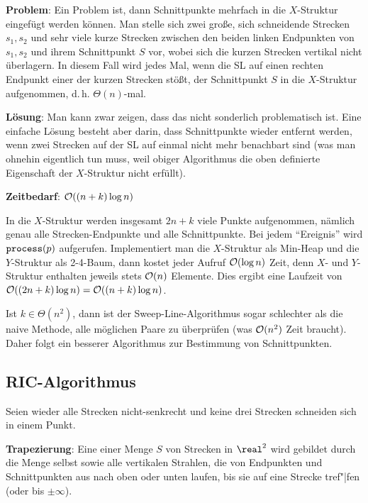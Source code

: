 \linie

\textbf{Problem}:
Ein Problem ist, dann Schnittpunkte mehrfach in die $X$-Struktur eingefügt werden können.
Man stelle sich zwei große, sich schneidende Strecken $s_1, s_2$
und sehr viele kurze Strecken zwischen den beiden linken Endpunkten von $s_1, s_2$ und
ihrem Schnittpunkt $S$ vor, wobei sich die kurzen Strecken vertikal nicht überlagern.
In diesem Fall wird jedes Mal, wenn die SL auf einen rechten Endpunkt einer der kurzen Strecken
stößt, der Schnittpunkt $S$ in die $X$-Struktur aufgenommen, d.\,h. $\Theta(n)$-mal.

\textbf{Lösung}:
Man kann zwar zeigen, dass das nicht sonderlich problematisch ist.
Eine einfache Lösung besteht aber darin, dass Schnittpunkte wieder entfernt werden,
wenn zwei Strecken auf der SL auf einmal nicht mehr benachbart sind
(was man ohnehin eigentlich tun muss, weil obiger Algorithmus die
oben definierte Eigenschaft der $X$-Struktur nicht erfüllt).

\linie

\textbf{Zeitbedarf}:
$\mathcal{O}((n + k) \log n)$

\begin{Beweis}
    In die $X$-Struktur werden insgesamt $2n + k$ viele Punkte aufgenommen, nämlich genau alle
    Strecken-Endpunkte und alle Schnittpunkte.
    Bei jedem "`Ereignis"' wird $\texttt{process}(p)$ aufgerufen.
    Implementiert man die $X$-Struktur als Min-Heap und die $Y$-Struktur als 2-4-Baum,
    dann kostet jeder Aufruf $\mathcal{O}(\log n)$ Zeit,
    denn $X$- und $Y$-Struktur enthalten jeweils stets $\mathcal{O}(n)$ Elemente.
    Dies ergibt eine Laufzeit von $\mathcal{O}((2n + k) \log n) = \mathcal{O}((n + k) \log n)$.
\end{Beweis}

Ist $k \in \Theta(n^2)$, dann ist der Sweep-Line-Algorithmus sogar schlechter als die naive
Methode, alle möglichen Paare zu überprüfen (was $\mathcal{O}(n^2)$ Zeit braucht).
Daher folgt ein besserer Algorithmus zur Bestimmung von Schnittpunkten.

\pagebreak

\subsection{%
    RIC-Algorithmus%
}

Seien wieder alle Strecken nicht-senkrecht und keine drei Strecken schneiden sich in einem Punkt.

\textbf{Trapezierung}:
Eine  einer Menge $S$ von Strecken in $\real^2$ wird gebildet durch die Menge
selbst sowie alle vertikalen Strahlen, die von Endpunkten und Schnittpunkten aus nach oben oder
unten laufen, bis sie auf eine Strecke tref"|fen (oder bis $\pm\infty$).

